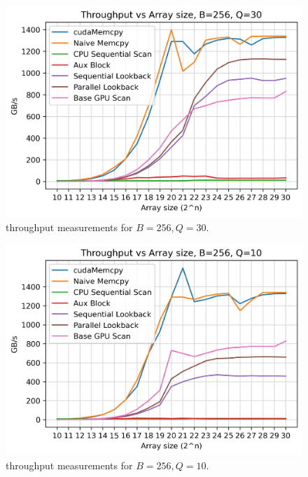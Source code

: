 \documentclass[twocolumn]{article}
\begin{document}
\begin{figure}[h]
    \centering
    \includegraphics[width=\linewidth]{report/plots/throughput_vs_array_size_B256_Q30.png}
    \caption{throughput measurements for $B=256,Q=30$.}
    \label{fig:plot_256_30}
\end{figure}

\begin{figure}[h]
    \centering
    \includegraphics[width=\linewidth]{report/plots/throughput_vs_array_size_B256_Q10.png}
    \caption{throughput measurements for $B=256,Q=10$.}
    \label{fig:plot_256_10}
\end{figure}
\end{document}
